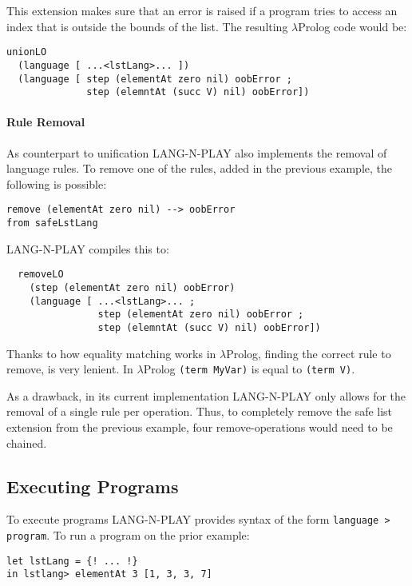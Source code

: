 This extension makes sure that an error is raised if a program tries to access an index that is outside the bounds of the list. The resulting $\lambda$Prolog code would be:

\begin{lstlisting}
unionLO
  (language [ ...<lstLang>... ])
  (language [ step (elementAt zero nil) oobError ;
              step (elemntAt (succ V) nil) oobError])
\end{lstlisting}

\paragraph{Rule Removal}
As counterpart to unification LANG-N-PLAY also implements the removal of language rules. To remove one of the rules, added in the previous example, the following is possible:

\begin{lstlisting}
remove (elementAt zero nil) --> oobError
from safeLstLang 
\end{lstlisting}

LANG-N-PLAY compiles this to:

\begin{lstlisting}
  removeLO
    (step (elementAt zero nil) oobError)
    (language [ ...<lstLang>... ;
                step (elementAt zero nil) oobError ;
                step (elemntAt (succ V) nil) oobError])
\end{lstlisting}

Thanks to how equality matching works in $\lambda$Prolog, finding the correct rule to remove, is very lenient. In $\lambda$Prolog \lstinline|(term MyVar)| is equal to \lstinline|(term V)|.

As a drawback, in its current implementation LANG-N-PLAY only allows for the removal of a single rule per operation. Thus, to completely remove the safe list extension from the previous example, four remove-operations would need to be chained.


\subsection{Executing Programs}
To execute programs LANG-N-PLAY provides syntax of the form \lstinline|language > program|. To run a program on the prior example:

\begin{lstlisting}
let lstLang = {! ... !}
in lstlang> elementAt 3 [1, 3, 3, 7]
\end{lstlisting}

